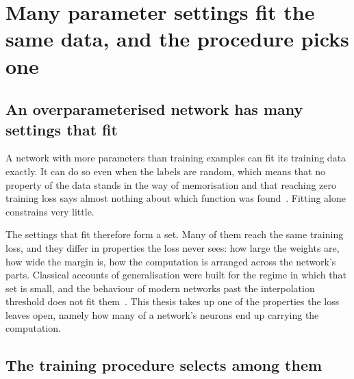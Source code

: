 

\section{Many parameter settings fit the same data, and the procedure picks one}
\label{sec:bg_solutionset}

\subsection{An overparameterised network has many settings that fit}
\label{sec:bg_interpolation}

A network with more parameters than training examples can fit its training
data exactly. It can do so even when the labels are random, which means that
no property of the data stands in the way of memorisation and that reaching
zero training loss says almost nothing about which function was
found~\cite{zhang_understanding_2017}. Fitting alone constrains very little.

The settings that fit therefore form a set. Many of them reach the same
training loss, and they differ in properties the loss never sees: how large the weights are, how wide the margin is, how the computation
is arranged across the network's parts. Classical accounts of generalisation
were built for the regime in which that set is small, and the behaviour of
modern networks past the interpolation threshold does not fit
them~\cite{neyshabur_search_2015, belkin_reconciling_2019}. This thesis takes
up one of the properties the loss leaves open, namely how many of a network's
neurons end up carrying the computation.

\subsection{The training procedure selects among them}
\label{sec:bg_implicitbias}

